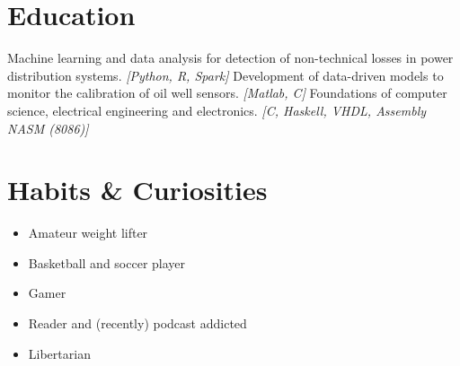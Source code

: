 \documentclass[letterpaper]{twentysecondcv} %
\begin{document}

% 


\section{Education}

\begin{twenty} %
	{Machine learning and data analysis for detection of non-technical losses in power 
	distribution systems. \newline
	\emph{[Python, R, Spark]}}
	{Development of data-driven models to monitor the calibration of oil well sensors. 
	\emph{[Matlab, C]}}
	{Foundations of computer science, electrical engineering and electronics.
	\emph{[C, Haskell, VHDL, Assembly NASM (8086)]}}
\end{twenty}



\section{Habits \& Curiosities}

\begin{itemize}
    \item Amateur weight lifter
    \item Basketball and soccer player
    \item Gamer
    \item Reader and (recently) podcast addicted 
    \item Libertarian
\end{itemize}
\end{document}
